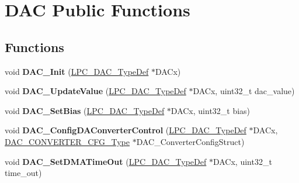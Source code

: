 \hypertarget{group___d_a_c___public___functions}{\section{\-D\-A\-C \-Public \-Functions}
\label{group___d_a_c___public___functions}
}
\subsection*{\-Functions}
\begin{DoxyCompactItemize}
\item 
\hypertarget{group___d_a_c___public___functions_ga280c80eaa28107c74a72d5902a9505b6}{void {\bfseries \-D\-A\-C\-\_\-\-Init} (\hyperlink{struct_l_p_c___d_a_c___type_def}{\-L\-P\-C\-\_\-\-D\-A\-C\-\_\-\-Type\-Def} $\ast$\-D\-A\-Cx)}\label{group___d_a_c___public___functions_ga280c80eaa28107c74a72d5902a9505b6}

\item 
\hypertarget{group___d_a_c___public___functions_ga5bd3b0f2ecaa6bcaea9a32b8dfcc6100}{void {\bfseries \-D\-A\-C\-\_\-\-Update\-Value} (\hyperlink{struct_l_p_c___d_a_c___type_def}{\-L\-P\-C\-\_\-\-D\-A\-C\-\_\-\-Type\-Def} $\ast$\-D\-A\-Cx, uint32\-\_\-t dac\-\_\-value)}\label{group___d_a_c___public___functions_ga5bd3b0f2ecaa6bcaea9a32b8dfcc6100}

\item 
\hypertarget{group___d_a_c___public___functions_gaa095bb85e3cc62a3846e61b6d6b62025}{void {\bfseries \-D\-A\-C\-\_\-\-Set\-Bias} (\hyperlink{struct_l_p_c___d_a_c___type_def}{\-L\-P\-C\-\_\-\-D\-A\-C\-\_\-\-Type\-Def} $\ast$\-D\-A\-Cx, uint32\-\_\-t bias)}\label{group___d_a_c___public___functions_gaa095bb85e3cc62a3846e61b6d6b62025}

\item 
\hypertarget{group___d_a_c___public___functions_ga6bae9b8ccc7b31561243e16f54e005c2}{void {\bfseries \-D\-A\-C\-\_\-\-Config\-D\-A\-Converter\-Control} (\hyperlink{struct_l_p_c___d_a_c___type_def}{\-L\-P\-C\-\_\-\-D\-A\-C\-\_\-\-Type\-Def} $\ast$\-D\-A\-Cx, \hyperlink{struct_d_a_c___c_o_n_v_e_r_t_e_r___c_f_g___type}{\-D\-A\-C\-\_\-\-C\-O\-N\-V\-E\-R\-T\-E\-R\-\_\-\-C\-F\-G\-\_\-\-Type} $\ast$\-D\-A\-C\-\_\-\-Converter\-Config\-Struct)}\label{group___d_a_c___public___functions_ga6bae9b8ccc7b31561243e16f54e005c2}

\item 
\hypertarget{group___d_a_c___public___functions_ga250fb040031838f0603aee5e80945ba8}{void {\bfseries \-D\-A\-C\-\_\-\-Set\-D\-M\-A\-Time\-Out} (\hyperlink{struct_l_p_c___d_a_c___type_def}{\-L\-P\-C\-\_\-\-D\-A\-C\-\_\-\-Type\-Def} $\ast$\-D\-A\-Cx, uint32\-\_\-t time\-\_\-out)}\label{group___d_a_c___public___functions_ga250fb040031838f0603aee5e80945ba8}

\end{DoxyCompactItemize}
